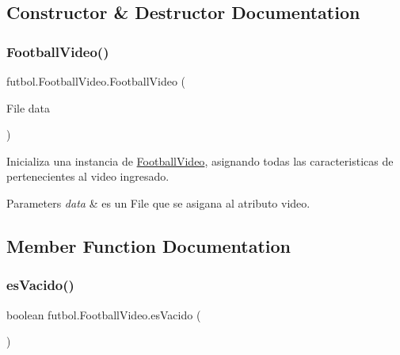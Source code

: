 \subsection{Constructor \& Destructor Documentation}
\hypertarget{classfutbol_1_1_football_video_a89741e0d173c2aa8640b6a7d237f85cc}{}\label{classfutbol_1_1_football_video_a89741e0d173c2aa8640b6a7d237f85cc} 
\subsubsection{\texorpdfstring{Football\+Video()}{FootballVideo()}}
{\footnotesize\ttfamily futbol.\+Football\+Video.\+Football\+Video (\begin{DoxyParamCaption}\item[{File}]{data }\end{DoxyParamCaption})}

Inicializa una instancia de \hyperlink{classfutbol_1_1_football_video}{Football\+Video}, asignando todas las caracteristicas de pertenecientes al video ingresado. 
\begin{DoxyParams}{Parameters}
{\em data} & es un File que se asigana al atributo video. \\
\hline
\end{DoxyParams}


\subsection{Member Function Documentation}
\hypertarget{classfutbol_1_1_football_video_a05d954e93f7526b037ce5d88c672540b}{}\label{classfutbol_1_1_football_video_a05d954e93f7526b037ce5d88c672540b} 
\subsubsection{\texorpdfstring{es\+Vacido()}{esVacido()}}
{\footnotesize\ttfamily boolean futbol.\+Football\+Video.\+es\+Vacido (\begin{DoxyParamCaption}{ }\end{DoxyParamCaption})}

\hypertarget{classfutbol_1_1_football_video_ac304b913823a5a41123958aea7618098}{}\label{classfutbol_1_1_football_video_ac304b913823a5a41123958aea7618098} 
